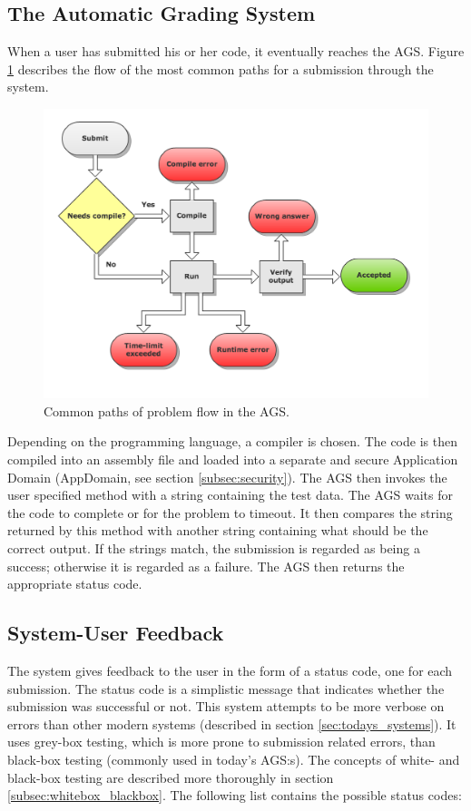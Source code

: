 \subsection{The Automatic Grading System}
When a user has submitted his or her code, it eventually reaches the AGS. Figure \ref{fig:flowchart} describes the flow of the most common paths for a submission through the system.

\begin{figure}[h]
	\centering
	\includegraphics[width=0.8\linewidth]{chapters/media/flowchart.png}
	\caption{Common paths of problem flow in the AGS.}
	\label{fig:flowchart}
\end{figure}

Depending on the programming language, a compiler is chosen. The code is then compiled into an assembly file and loaded into a separate and secure Application Domain (AppDomain, see section \ref{subsec:security}). The AGS then invokes the user specified method with a string containing the test data. The AGS waits for the code to complete or for the problem to timeout. It then compares the string returned by this method with another string containing what should be the correct output. If the strings match, the submission is regarded as being a success; otherwise it is regarded as a failure. The AGS then returns the appropriate status code.


\subsection{System-User Feedback} \label{subsec:status_codes}
The system gives feedback to the user in the form of a status code, one for each submission. The status code is a simplistic message that indicates whether the submission was successful or not. This system attempts to be more verbose on errors than other modern systems (described in section \ref{sec:todays_systems}). It uses grey-box testing, which is more prone to submission related errors, than black-box testing (commonly used in today's AGS:s). The concepts of white- and black-box testing are described more thoroughly in section \ref{subsec:whitebox_blackbox}. The following list contains the possible status codes:

